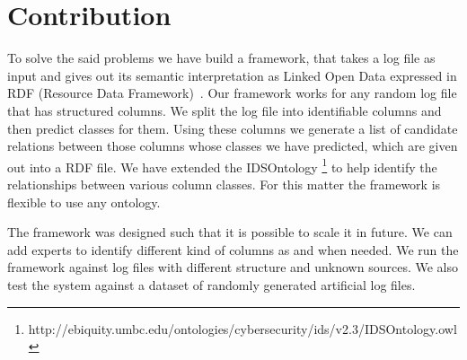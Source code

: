 \section{Contribution}

To solve the said problems we have build a framework, that takes a log file as input and gives out its semantic interpretation as Linked Open Data expressed in RDF (Resource Data Framework)~\cite{brickley2004rdf}. Our framework works for any random log file that has structured columns. We split the log file into identifiable columns and then predict classes for them. Using these columns we generate a list of candidate relations between those columns whose classes we have predicted, which are given out into a RDF file. We have extended the IDSOntology \footnote{http://ebiquity.umbc.edu/ontologies/cybersecurity/ids/v2.3/IDSOntology.owl} to help identify the relationships between various column classes. For this matter the framework is flexible to use any ontology.

The framework was designed such that it is possible to scale it in future. We can add experts to identify different kind of columns as and when needed. We run the framework against log files with different structure and unknown sources. We also test the system against a dataset of randomly generated artificial log files.
